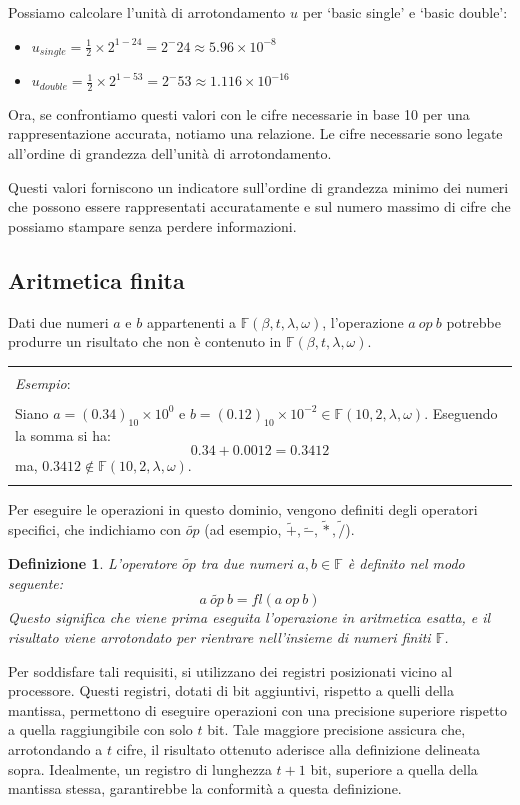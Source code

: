 \documentclass{article}
\newtheorem*{definition}{\color{red}\textbf{Definizione}}
\numberwithin{equation}{section}
\newenvironment{example}
{\begin{center}
        \begin{tabular}{|p{0.9\textwidth}|}
            \hline \\ 
            \textit{Esempio}: \\\\ 
        }
        {
            \\\\ \hline
        \end{tabular}
    \end{center}
}
\begin{document}
Possiamo calcolare l'unità di arrotondamento $u$ per `basic single' e `basic
double':
\begin{itemize}
    \item $u_{single}= \frac{1}{2} \times 2^{1-24}=2^-24\approx 5.96 \times
        10 ^{-8}$ 
    \item $u_{double}= \frac{1}{2} \times 2^{1-53}=2^-53\approx 1.116 \times
        10 ^{-16}$ 
\end{itemize}
Ora, se confrontiamo questi valori con le cifre necessarie in base 10 per
una rappresentazione accurata, notiamo una relazione. Le cifre necessarie
sono legate all'ordine di grandezza dell'unità di arrotondamento.

Questi valori forniscono un indicatore sull'ordine di grandezza minimo dei 
numeri che possono essere rappresentati accuratamente e sul numero massimo di 
cifre che possiamo stampare senza perdere informazioni.
\subsection{Aritmetica finita}
Dati due numeri $a$ e $b$ appartenenti a $\mathbb{F}(\beta,t,\lambda,\omega)$,
l'operazione $a\ op\ b$ potrebbe produrre un risultato che non è contenuto in
$\mathbb{F}(\beta,t,\lambda,\omega)$.
\begin{example}
    Siano $a=(0.34)_{10}\times10^{0}$ e $b=(0.12)_{10}\times10^{-2}\in
    \mathbb{F}(10,2,\lambda,\omega)$. Eseguendo la somma si ha: 
    $$0.34+0.0012=0.3412$$
    ma, $0.3412\notin \mathbb{F}(10,2,\lambda,\omega)$.
\end{example}
Per eseguire le operazioni in questo dominio, vengono definiti degli
operatori specifici, che indichiamo con $\tilde{op}$ (ad esempio, $\tilde{+},
\tilde{-}, \tilde{*}, \tilde{/}$).
\begin{definition}
    L'operatore $\tilde{op}$ tra due numeri $a,b\in \mathbb{F}$ è definito nel modo seguente:
    $$a\ \tilde{op}\ b=fl(a\ op\ b)$$
    Questo significa che viene prima eseguita l'operazione in aritmetica
    esatta, e il risultato viene arrotondato per rientrare nell'insieme di
    numeri finiti $\mathbb{F}$.
\end{definition}
Per soddisfare tali requisiti, si utilizzano dei registri posizionati vicino 
al processore. Questi registri, dotati di bit aggiuntivi, 
rispetto a quelli della mantissa, permettono di eseguire operazioni con una
precisione superiore rispetto a quella raggiungibile con solo $t$ bit. Tale
maggiore precisione assicura che, arrotondando a $t$ cifre, il risultato ottenuto
aderisce alla definizione delineata sopra. Idealmente, un registro di lunghezza
$t+1$ bit, superiore a quella della mantissa stessa, garantirebbe la
conformità a questa definizione.
\vskip 0.1in
\end{document}
